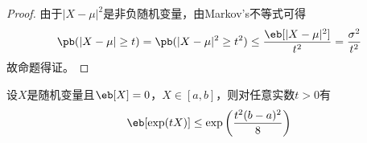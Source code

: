 \documentclass{ctexart}
\begin{document}
\begin{proof}
    由于$|X - \mu|^2$是非负随机变量，由Markov's不等式可得
    \begin{align*}
        \pb (|X - \mu| \ge t) = \pb (|X - \mu|^2 \ge t^2) \le \frac{\eb[|X - \mu|^2]}{t^2} = \frac{\sigma^2}{t^2}
    \end{align*}
    故命题得证。
\end{proof}

\begin{lemma}
    设$X$是随机变量且$\eb[X] = 0$，$X \in [a,b]$，则对任意实数$t>0$有
    \begin{align*}
        \eb[\exp(tX)] \le \exp \left( \frac{t^2(b-a)^2}{8} \right)
    \end{align*}
\end{lemma}
\end{document}
